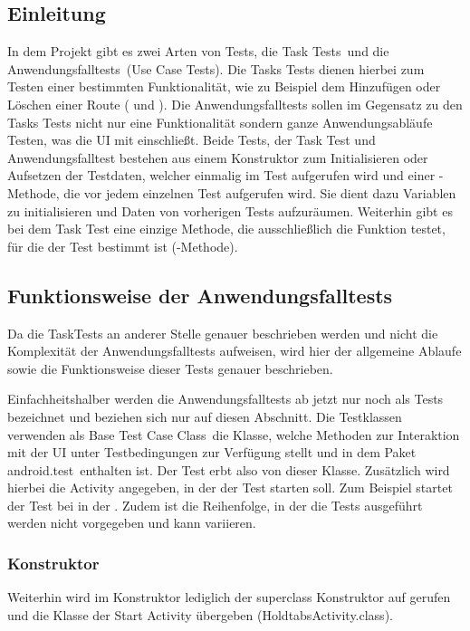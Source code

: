 \subsection{Einleitung}
In dem Projekt gibt es zwei Arten von Tests, die \glqq Task Tests\grqq\ und die \glqq Anwendungsfalltests\grqq\ (Use Case Tests).
Die Tasks Tests dienen hierbei zum Testen einer bestimmten Funktionalität, wie zu Beispiel dem Hinzufügen oder Löschen einer Route ( und ).
Die Anwendungsfalltests sollen im Gegensatz zu den Tasks Tests nicht nur eine Funktionalität sondern ganze Anwendungsabläufe Testen, was die UI mit einschließt.
Beide Tests, der Task Test und Anwendungsfalltest bestehen aus einem Konstruktor zum Initialisieren oder Aufsetzen der Testdaten, welcher einmalig im Test aufgerufen wird und einer -Methode, die vor jedem einzelnen Test aufgerufen wird. Sie dient dazu Variablen zu initialisieren und Daten von vorherigen Tests \glqq aufzuräumen\grqq. Weiterhin gibt es  bei dem Task Test eine einzige Methode, die ausschließlich die Funktion testet, für die der Test bestimmt ist (-Methode).

\subsection{Funktionsweise der Anwendungsfalltests}
Da die TaskTests an anderer Stelle genauer beschrieben werden und nicht die Komplexität der Anwendungsfalltests aufweisen, wird hier der allgemeine Ablaufe sowie die Funktionsweise dieser Tests genauer beschrieben.

Einfachheitshalber werden die Anwendungsfalltests ab jetzt nur noch als Tests bezeichnet und beziehen sich nur auf diesen Abschnitt. Die Testklassen verwenden als \glqq Base Test Case Class\grqq\ die  Klasse, welche Methoden zur Interaktion mit der UI unter Testbedingungen zur Verfügung stellt und in dem Paket \glqq android.test\grqq\ enthalten ist.
Der Test erbt also von dieser Klasse. Zusätzlich wird hierbei die Activity angegeben, in der der Test starten soll. Zum Beispiel startet der Test bei  in der . Zudem ist die Reihenfolge, in der die Tests ausgeführt werden nicht vorgegeben und kann variieren.

\subsubsection*{Konstruktor}
Weiterhin wird im Konstruktor lediglich der superclass Konstruktor auf gerufen und die Klasse der Start Activity übergeben (HoldtabsActivity.class).

